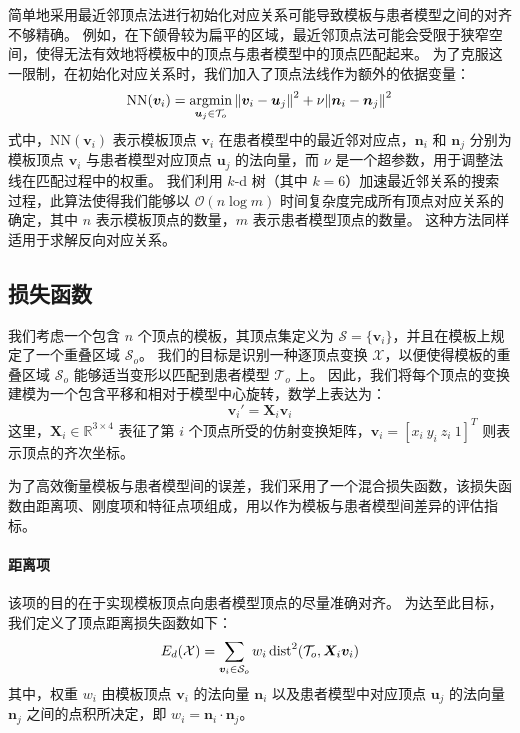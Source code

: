 简单地采用最近邻顶点法进行初始化对应关系可能导致模板与患者模型之间的对齐不够精确。
例如，在下颌骨较为扁平的区域，最近邻顶点法可能会受限于狭窄空间，使得无法有效地将模板中的顶点与患者模型中的顶点匹配起来。
为了克服这一限制，在初始化对应关系时，我们加入了顶点法线作为额外的依据变量：
\begin{equation}
  \mathrm{NN}(\bm{v}_i) = \operatorname*{argmin}_{\bm{u}_j \in \mathcal{T}_o} \norm{\bm{v}_i - \bm{u}_j}^2 + \nu \norm{\bm{n}_i - \bm{n}_j}^2
\end{equation}
式中，$\mathrm{NN}(\bm{v}_i)$ 表示模板顶点 $\bm{v}_i$ 在患者模型中的最近邻对应点，$\bm{n}_i$ 和 $\bm{n}_j$ 分别为模板顶点 $\bm{v}_i$ 与患者模型对应顶点 $\bm{u}_j$ 的法向量，而 $\nu$ 是一个超参数，用于调整法线在匹配过程中的权重。
我们利用 $k$-d 树（其中 $k = 6$）加速最近邻关系的搜索过程，此算法使得我们能够以 $\mathcal{O}(n \log{m})$ 时间复杂度完成所有顶点对应关系的确定，其中 $n$ 表示模板顶点的数量，$m$ 表示患者模型顶点的数量。
这种方法同样适用于求解反向对应关系。

\subsection{损失函数}

我们考虑一个包含 $n$ 个顶点的模板，其顶点集定义为 $\mathcal{S} = \{\bm{v}_i\}$，并且在模板上规定了一个重叠区域 $\mathcal{S}_o$。
我们的目标是识别一种逐顶点变换 $\mathcal{X}$，以便使得模板的重叠区域 $\mathcal{S}_o$ 能够适当变形以匹配到患者模型 $\mathcal{T}_o$ 上。
因此，我们将每个顶点的变换建模为一个包含平移和相对于模型中心旋转，数学上表达为：
\begin{equation}
  \bm{v}_i' = \bm{X}_i \bm{v}_i
\end{equation}
这里，$\bm{X}_i \in \mathbb{R}^{3 \times 4}$ 表征了第 $i$ 个顶点所受的仿射变换矩阵，$\bm{v}_i = [x_i ~ y_i ~ z_i ~ 1]^T$ 则表示顶点的齐次坐标。

为了高效衡量模板与患者模型间的误差，我们采用了一个混合损失函数，该损失函数由距离项、刚度项和特征点项组成，用以作为模板与患者模型间差异的评估指标。

\paragraph{距离项}
该项的目的在于实现模板顶点向患者模型顶点的尽量准确对齐。
为达至此目标，我们定义了顶点距离损失函数如下：
\begin{equation}
  E_d(\mathcal{X}) = \sum_{\bm{v}_i \in \mathcal{S}_o} w_i \operatorname{dist}^2(\mathcal{T}_o, \bm{X}_i \bm{v}_i)
\end{equation}
其中，权重 $w_i$ 由模板顶点 $\bm{v}_i$ 的法向量 $\bm{n}_i$ 以及患者模型中对应顶点 $\bm{u}_j$ 的法向量 $\bm{n}_j$ 之间的点积所决定，即 $w_i = \bm{n}_i \cdot \bm{n}_j$。

